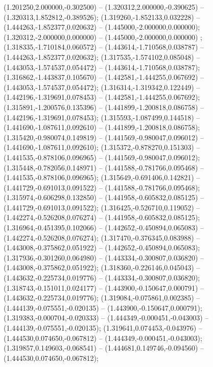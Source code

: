  (1.201250,2.000000,-0.302500) -- (1.320312,2.000000,-0.390625) -- (1.320313,1.852812,-0.389526);
 (1.319260,-1.852133,0.032228) -- (1.444263,-1.852377,0.020632) -- (1.445000,-2.000000,0.000000);
 (1.320312,-2.000000,0.000000) -- (1.445000,-2.000000,0.000000) ;
 (1.318335,-1.710184,0.060572) -- (1.443614,-1.710568,0.038787) -- (1.444263,-1.852377,0.020632);
 (1.317535,-1.574102,0.085048) -- (1.443053,-1.574537,0.054472) -- (1.443614,-1.710568,0.038787);
 (1.316862,-1.443837,0.105670) -- (1.442581,-1.444255,0.067692) -- (1.443053,-1.574537,0.054472);
 (1.316314,-1.319342,0.122449) -- (1.442196,-1.319691,0.078453) -- (1.442581,-1.444255,0.067692);
 (1.315891,-1.200576,0.135396) -- (1.441899,-1.200818,0.086758) -- (1.442196,-1.319691,0.078453);
 (1.315593,-1.087499,0.144518) -- (1.441690,-1.087611,0.092610) -- (1.441899,-1.200818,0.086758);
 (1.315420,-0.980074,0.149819) -- (1.441569,-0.980047,0.096012) -- (1.441690,-1.087611,0.092610);
 (1.315372,-0.878270,0.151303) -- (1.441535,-0.878106,0.096965) -- (1.441569,-0.980047,0.096012);
 (1.315448,-0.782056,0.148971) -- (1.441588,-0.781766,0.095468) -- (1.441535,-0.878106,0.096965);
 (1.315649,-0.691406,0.142821) -- (1.441729,-0.691013,0.091522) -- (1.441588,-0.781766,0.095468);
 (1.315974,-0.606298,0.132850) -- (1.441958,-0.605832,0.085125) -- (1.441729,-0.691013,0.091522);
 (1.316425,-0.526710,0.119052) -- (1.442274,-0.526208,0.076274) -- (1.441958,-0.605832,0.085125);
 (1.316964,-0.451395,0.102066) -- (1.442652,-0.450894,0.065083) -- (1.442274,-0.526208,0.076274);
 (1.317470,-0.376345,0.083988) -- (1.443008,-0.375862,0.051922) -- (1.442652,-0.450894,0.065083);
 (1.317936,-0.301260,0.064980) -- (1.443334,-0.300807,0.036820) -- (1.443008,-0.375862,0.051922);
 (1.318360,-0.226146,0.045043) -- (1.443632,-0.225734,0.019776) -- (1.443334,-0.300807,0.036820);
 (1.318743,-0.151011,0.024177) -- (1.443900,-0.150647,0.000791) -- (1.443632,-0.225734,0.019776);
 (1.319084,-0.075861,0.002385) -- (1.444139,-0.075551,-0.020135) -- (1.443900,-0.150647,0.000791);
 (1.319383,-0.000704,-0.020333) -- (1.444349,-0.000451,-0.043003) -- (1.444139,-0.075551,-0.020135);
 (1.319641,0.074453,-0.043976) -- (1.444530,0.074650,-0.067812) -- (1.444349,-0.000451,-0.043003);
 (1.319857,0.149603,-0.068541) -- (1.444681,0.149746,-0.094560) -- (1.444530,0.074650,-0.067812);
